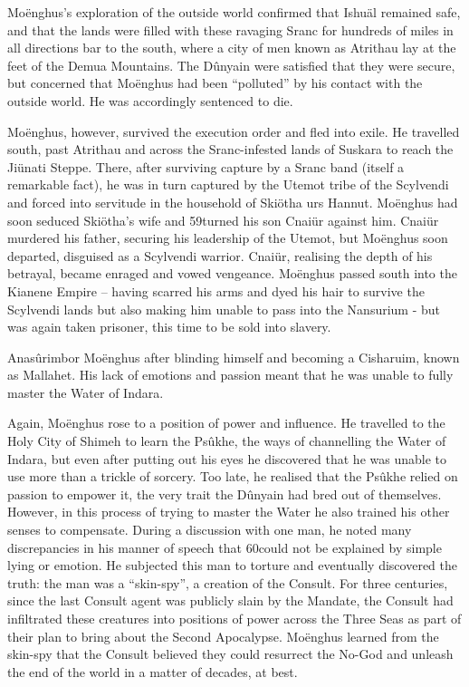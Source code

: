 \documentclass[]{book}
\begin{document}
Moënghus's exploration of the outside world confirmed that Ishuäl remained safe, and
that the lands were filled with these ravaging Sranc for hundreds of miles in all
directions bar to the south, where a city of men known as Atrithau lay at the feet of the
Demua Mountains. The Dûnyain were satisfied that they were secure, but concerned
that Moënghus had been ``polluted'' by his contact with the outside world. He was
accordingly sentenced to die.

Moënghus, however, survived the execution order and fled into exile. He travelled
south, past Atrithau and across the Sranc-infested lands of Suskara to reach the Jiünati
Steppe. There, after surviving capture by a Sranc band (itself a remarkable fact), he was
in turn captured by the Utemot tribe of the Scylvendi and forced into servitude in the
household of Skiötha urs Hannut. Moënghus had soon seduced Skiötha's wife and
59turned his son Cnaiür against him. Cnaiür murdered his father, securing his leadership
of the Utemot, but Moënghus soon departed, disguised as a Scylvendi warrior. Cnaiür,
realising the depth of his betrayal, became enraged and vowed vengeance. Moënghus
passed south into the Kianene Empire -- having scarred his arms and dyed his hair to
survive the Scylvendi lands but also making him unable to pass into the Nansurium -
but was again taken prisoner, this time to be sold into slavery.

Anasûrimbor Moënghus after blinding himself and becoming a Cisharuim, known as Mallahet. His lack of emotions and passion meant that he was unable to fully master the Water of Indara.

Again, Moënghus rose to a position of power and influence. He travelled to the Holy
City of Shimeh to learn the Psûkhe, the ways of channelling the Water of Indara, but
even after putting out his eyes he discovered that he was unable to use more than a
trickle of sorcery. Too late, he realised that the Psûkhe relied on passion to empower it,
the very trait the Dûnyain had bred out of themselves. However, in this process of
trying to master the Water he also trained his other senses to compensate. During a
discussion with one man, he noted many discrepancies in his manner of speech that
60could not be explained by simple lying or emotion. He subjected this man to torture
and eventually discovered the truth: the man was a ``skin-spy'', a creation of the Consult.
For three centuries, since the last Consult agent was publicly slain by the Mandate, the
Consult had infiltrated these creatures into positions of power across the Three Seas as
part of their plan to bring about the Second Apocalypse. Moënghus learned from the
skin-spy that the Consult believed they could resurrect the No-God and unleash the
end of the world in a matter of decades, at best.
\end{document}

